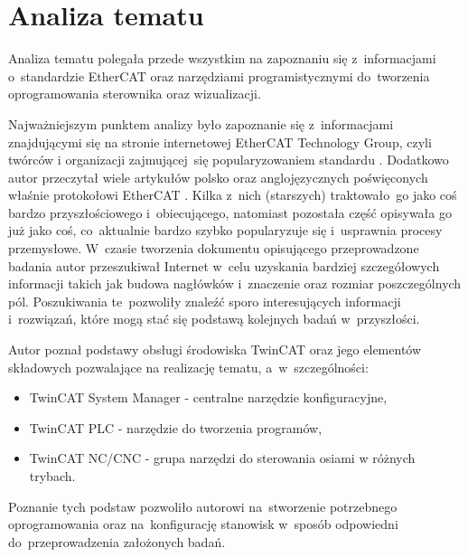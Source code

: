 \section{Analiza tematu}
Analiza tematu polegała przede wszystkim na zapoznaniu się z~informacjami o~standardzie EtherCAT oraz narzędziami programistycznymi do~tworzenia oprogramowania sterownika oraz wizualizacji.

Najważniejszym punktem analizy było zapoznanie się z~informacjami znajdującymi się na stronie internetowej EtherCAT Technology Group, czyli twórców i organizacji zajmującej~się popularyzowaniem standardu \cite{ETG_doc}.
Dodatkowo autor przeczytał wiele artykułów polsko oraz anglojęzycznych poświęconych właśnie protokołowi EtherCAT \cite{art1_etherCAT, art2_etherCAT, art3_etherCAT, art4_etherCAT, art5_etherCAT, art6_etherCAT, art7_etherCAT, art8_etherCAT, art9_etherCAT}. Kilka z~nich (starszych) traktowało~go jako coś bardzo przyszłościowego i~obiecującego, natomiast pozostała część opisywała go już jako coś, co~aktualnie bardzo szybko popularyzuje się i~usprawnia procesy przemysłowe.
W~czasie tworzenia dokumentu opisującego przeprowadzone badania autor przeszukiwał Internet w~celu uzyskania bardziej szczegółowych informacji takich jak budowa nagłówków i~znaczenie oraz rozmiar poszczególnych pól. Poszukiwania te~pozwoliły znaleźć sporo interesujących informacji i~rozwiązań, które mogą stać się podstawą kolejnych badań w~przyszłości.

Autor poznał podstawy obsługi środowiska TwinCAT oraz jego elementów składowych pozwalające na realizację tematu, a~w~szczególności:
\begin{itemize}
\item TwinCAT System Manager - centralne narzędzie konfiguracyjne,
\item TwinCAT PLC - narzędzie do tworzenia programów,
\item TwinCAT NC/CNC - grupa narzędzi do sterowania osiami w różnych trybach.
\end{itemize} 
Poznanie tych podstaw pozwoliło autorowi na~stworzenie potrzebnego oprogramowania oraz na~konfigurację stanowisk w~sposób odpowiedni do~przeprowadzenia założonych badań.
